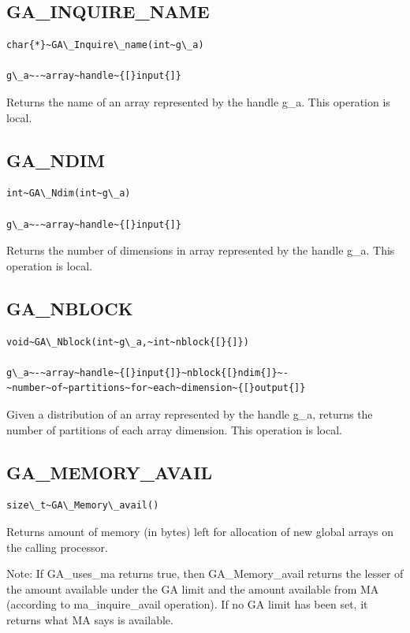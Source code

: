 \subsection*{\label{sub:GA_INQUIRE_NAME}GA\_INQUIRE\_NAME}
\begin{verbatim}
char{*}~GA\_Inquire\_name(int~g\_a)

g\_a~-~array~handle~{[}input{]}
\end{verbatim}
Returns the name of an array represented by the handle g\_a. This
operation is local. 


\subsection*{\label{sub:GA_NDIM}GA\_NDIM}
\begin{verbatim}
int~GA\_Ndim(int~g\_a)

g\_a~-~array~handle~{[}input{]}
\end{verbatim}
Returns the number of dimensions in array represented by the handle
g\_a. This operation is local. 


\subsection*{\label{sub:GA_NBLOCK}GA\_NBLOCK}
\begin{verbatim}
void~GA\_Nblock(int~g\_a,~int~nblock{[}{]})

g\_a~-~array~handle~{[}input{]}~nblock{[}ndim{]}~-~number~of~partitions~for~each~dimension~{[}output{]}
\end{verbatim}
Given a distribution of an array represented by the handle g\_a, returns
the number of partitions of each array dimension. This operation is
local. 


\subsection*{\label{sub:GA_MEMORY_AVAIL}GA\_MEMORY\_AVAIL}
\begin{verbatim}
size\_t~GA\_Memory\_avail()
\end{verbatim}
Returns amount of memory (in bytes) left for allocation of new global
arrays on the calling processor.

Note: If GA\_uses\_ma returns true, then GA\_Memory\_avail returns
the lesser of the amount available under the GA limit and the amount
available from MA (according to ma\_inquire\_avail operation). If
no GA limit has been set, it returns what MA says is available.

